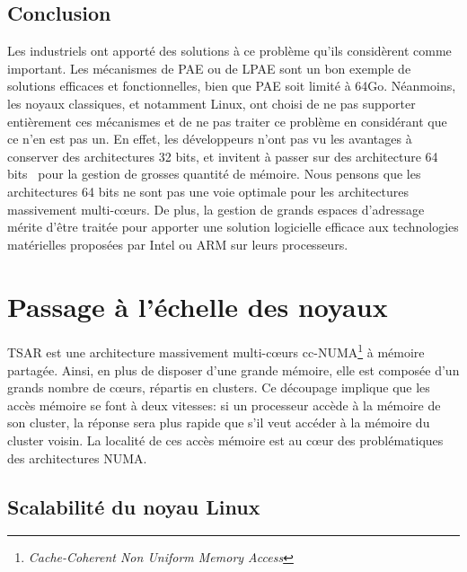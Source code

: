     \subsection{Conclusion}

      Les industriels ont apporté des solutions à ce problème qu'ils considèrent
      comme important. Les mécanismes de PAE ou de LPAE sont un bon exemple de
      solutions efficaces et fonctionnelles, bien que PAE soit limité à
      64Go. Néanmoins, les noyaux classiques, et notamment Linux, ont choisi de
      ne pas supporter entièrement ces mécanismes et de ne pas traiter ce
      problème en considérant que ce n'en est pas un. En effet, les développeurs
      n'ont pas vu les avantages à conserver des architectures 32 bits, et
      invitent à passer sur des architecture 64
      bits~\citep{gorman2004understanding} pour la gestion de grosses quantité
      de mémoire. Nous pensons que les architectures 64 bits ne sont pas une
      voie optimale pour les architectures massivement multi-c\oe urs. De plus,
      la gestion de grands espaces d'adressage mérite d'être traitée pour
      apporter une solution logicielle efficace aux technologies matérielles
      proposées par Intel ou ARM sur leurs processeurs.

  
  \section{Passage à l’échelle des noyaux}
  \label{sec:scalability}

    TSAR est une architecture massivement multi-c\oe urs
    cc-NUMA\footnote{\textit{Cache-Coherent Non Uniform Memory Access}} à
    mémoire partagée. Ainsi, en plus de disposer d'une grande mémoire, elle est
    composée d'un grands nombre de c\oe urs, répartis en clusters. Ce découpage
    implique que les accès mémoire se font à deux vitesses: si un processeur
    accède à la mémoire de son cluster, la réponse sera plus rapide que s'il
    veut accéder à la mémoire du cluster voisin. La localité de ces accès
    mémoire est au c\oe ur des problématiques des architectures NUMA. %


    \subsection{Scalabilité du noyau Linux}

